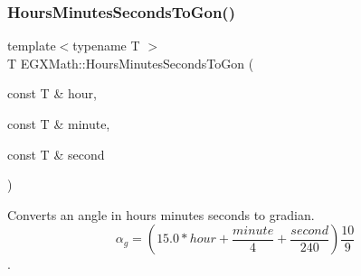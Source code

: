 \subsubsection{\texorpdfstring{Hours\+Minutes\+Seconds\+To\+Gon()}{HoursMinutesSecondsToGon()}}
{\footnotesize\ttfamily template$<$typename T $>$ \\
T E\+G\+X\+Math\+::\+Hours\+Minutes\+Seconds\+To\+Gon (\begin{DoxyParamCaption}\item[{const T \&}]{hour,  }\item[{const T \&}]{minute,  }\item[{const T \&}]{second }\end{DoxyParamCaption})}



Converts an angle in hours minutes seconds to gradian. \[\alpha_{g}=(15.0 * hour + \frac{minute}{4} + \frac{second}{240})\frac{10}{9}\]. 

